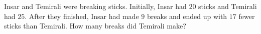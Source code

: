 Insar and Temirali were breaking sticks. Initially, Insar had $20$ sticks and Temirali had $25$. After they finished, Insar had made $9$ breaks and ended up with $17$ fewer sticks than Temirali. How many breaks did Temirali make?
